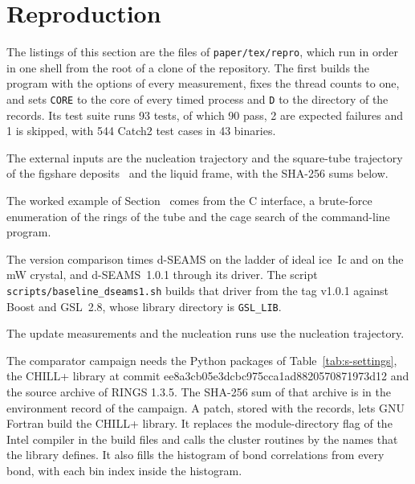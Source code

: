 \documentclass[preprint,12pt]{elsarticle}
\begin{document}

\section{Reproduction}
\label{sec:s-repro}

The listings of this section are the files of \texttt{paper/tex/repro},
which run in order in one shell from the root of a clone of the
repository.
The first builds the program with the options of every measurement,
fixes the thread counts to one, and sets \texttt{CORE} to the core of
every timed process and \texttt{D} to the directory of the records.
Its test suite runs 93 tests, of which 90 pass, 2 are expected failures
and 1 is skipped, with 544 Catch2 test cases in 43 binaries.

The external inputs are the nucleation trajectory and the square-tube
trajectory of the figshare
deposits~\cite{goswami2019nucleationdata,goswami2019nanotubedata} and
the liquid frame, with the SHA-256 sums below.

The worked example of Section~ comes from the C
interface, a brute-force enumeration of the rings of the tube and the
cage search of the command-line program.

The version comparison times d-SEAMS on the ladder of ideal ice~Ic and
on the mW crystal, and d-SEAMS~1.0.1 through its driver.
The script \texttt{scripts/baseline\_dseams1.sh} builds that driver from
the tag v1.0.1 against Boost and GSL~2.8, whose library directory is
\texttt{GSL\_LIB}.

The update measurements and the nucleation runs use the nucleation
trajectory.

The comparator campaign needs the Python packages of
Table~\ref{tab:s-settings}, the CHILL+ library at commit
ee8a3cb05e3dcbc975cca1ad8820570871973d12 and the source archive of RINGS
1.3.5.
The SHA-256 sum of that archive is in the environment record of the
campaign.
A patch, stored with the records, lets GNU Fortran build the CHILL+
library.
It replaces the module-directory flag of the Intel compiler in the build
files and calls the cluster routines by the names that the library
defines.
It also fills the histogram of bond correlations from every bond, with
each bin index inside the histogram.
\end{document}
